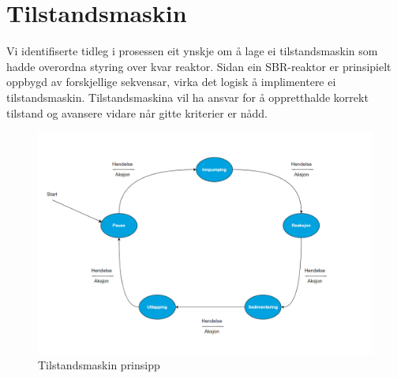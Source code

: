 \section{Tilstandsmaskin}
\thispagestyle{fancy}

Vi identifiserte tidleg i prosessen eit ynskje om å lage ei tilstandsmaskin som hadde overordna styring over kvar reaktor. 
Sidan ein \gls{SBR}-reaktor er prinsipielt oppbygd av forskjellige sekvensar, virka det logisk å implimentere ei tilstandsmaskin.
Tilstandsmaskina vil ha ansvar for å oppretthalde korrekt tilstand og avansere vidare når gitte kriterier er nådd.

\begin{figure}[htbp]
    \centering
    \includegraphics[width=1\textwidth]{Figurar/Tom tilstandsmaskin.png}
    \caption{Tilstandsmaskin prinsipp}\label{fig:Tilstandsmaskin prinsipp}    
\end{figure}

\newpage

